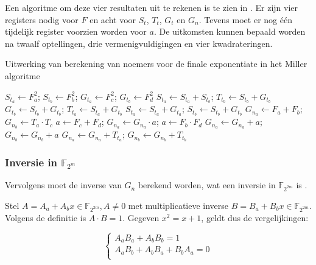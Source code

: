Een algoritme om deze vier resultaten uit te rekenen is te zien in . Er zijn vier registers nodig voor $F$ en acht voor $S_t$, $T_t$, $G_t$ en $G_n$. Tevens moet er nog \'e\'en tijdelijk register voorzien worden voor $a$. De uitkomsten kunnen bepaald worden na twaalf optellingen, drie vermenigvuldigingen en vier kwadrateringen.

\begin{algorithm}[h]
	\caption{Uitwerking van berekening van noemers voor de finale exponentiate in het Miller algoritme}
	\label{algoritme-implementatie-miller-final-noemers}
	$S_{t_a} \leftarrow F_a^2$; $S_{t_b} \leftarrow F_b^2$; $G_{t_a} \leftarrow F_c^2$; $G_{t_b} \leftarrow F_d^2$\;
	$S_{t_a} \leftarrow S_{t_a} + S_{t_b}$; $T_{t_b} \leftarrow S_{t_b} + G_{t_b}$\;
	$G_{t_b} \leftarrow S_{t_b} + G_{t_b}$; $T_{t_a} \leftarrow S_{t_a} + G_{t_b}$\;
	$S_{t_a} \leftarrow S_{t_a} + G_{t_a}$; $S_{t_b} \leftarrow S_{t_b} + G_{t_b}$\;
	$G_{n_a} \leftarrow F_a + F_b$; $G_{n_b} \leftarrow T_a \cdot T_c$\;
	$a \leftarrow F_c + F_d$; $G_{n_a} \leftarrow G_{n_a} \cdot a$; $a \leftarrow F_b \cdot F_d$\;
	$G_{n_a} \leftarrow G_{n_a} + a$; $G_{n_b} \leftarrow G_{n_b} + a$\;
	$G_{n_a} \leftarrow G_{n_a} + T_{t_a}$; $G_{n_b} \leftarrow G_{n_b} + T_{t_b}$\;
\end{algorithm}

\subsubsection{Inversie in $\mathbb{F}_{2^m}$}

Vervolgens moet de inverse van $G_n$ berekend worden, wat een inversie in $\mathbb{F}_{2^{2m}}$ is \cite{beuchat}.

Stel $A = A_a + A_b x \in \mathbb{F}_{2^{2m}}, A \neq 0$ met multiplicatieve inverse $B = B_a + B_b x \in \mathbb{F}_{2^{2m}}$. Volgens de definitie is $A \cdot B = 1$. Gegeven $x^2 = x + 1$, geldt dus de vergelijkingen:

\[\left\{\begin{array}{l}
A_a B_a + A_b B_b = 1\\
A_a B_b + A_b B_a + B_b A_a = 0\\
\end{array}\right.\]

